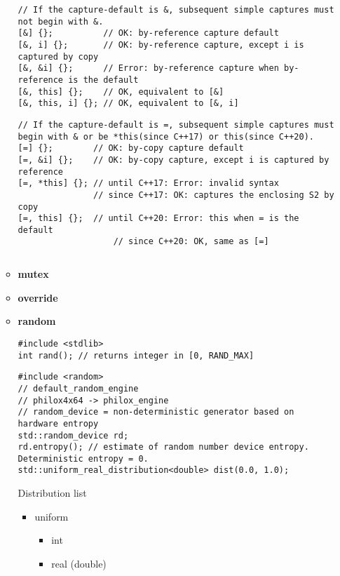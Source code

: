 \documentclass{article}
\begin{document}
\begin{itemize}
\begin{itemize}
              \begin{lstlisting}[style=cpp]
// If the capture-default is &, subsequent simple captures must not begin with &. 
[&] {};          // OK: by-reference capture default
[&, i] {};       // OK: by-reference capture, except i is captured by copy
[&, &i] {};      // Error: by-reference capture when by-reference is the default
[&, this] {};    // OK, equivalent to [&]
[&, this, i] {}; // OK, equivalent to [&, i]
         \end{lstlisting}
              \begin{lstlisting}[style=cpp]
// If the capture-default is =, subsequent simple captures must begin with & or be *this(since C++17) or this(since C++20). 
[=] {};        // OK: by-copy capture default
[=, &i] {};    // OK: by-copy capture, except i is captured by reference
[=, *this] {}; // until C++17: Error: invalid syntax
               // since C++17: OK: captures the enclosing S2 by copy
[=, this] {};  // until C++20: Error: this when = is the default
                   // since C++20: OK, same as [=]
         \end{lstlisting}
              \begin{lstlisting}[style=cpp]
         \end{lstlisting}
            \item \textbf{mutex}
            \item \textbf{override}
            \item \textbf{random}
              \begin{lstlisting}[style=cpp]
#include <stdlib>
int rand(); // returns integer in [0, RAND_MAX]
         \end{lstlisting}
              \begin{lstlisting}[style=cpp]
#include <random>
// default_random_engine
// philox4x64 -> philox_engine
// random_device = non-deterministic generator based on hardware entropy
std::random_device rd;
rd.entropy(); // estimate of random number device entropy. Deterministic entropy = 0.
std::uniform_real_distribution<double> dist(0.0, 1.0);
         \end{lstlisting}
              Distribution list
              \begin{itemize}
                \item uniform
                  \begin{itemize}
                    \item int
                    \item real (double)

\end{itemize}
\end{itemize}
\end{itemize}
\end{itemize}
\end{document}
